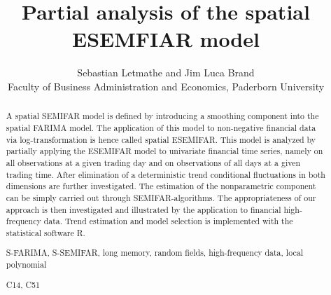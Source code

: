 \documentclass[12pt]{article}
\begin{document}
\title{Partial analysis of the spatial ESEMFIAR model}
\author{Sebastian Letmathe and Jim Luca Brand\\ Faculty of Business Administration and Economics,
Paderborn University}
\maketitle


\begin{abstract}

\noindent 
 A  spatial SEMIFAR model is defined by introducing a smoothing component into the spatial FARIMA model. The application of this model to non-negative financial data via log-transformation is hence called spatial ESEMIFAR. This model is analyzed by partially applying the ESEMIFAR model to univariate financial time series, namely on all observations at a given trading day and on observations of all days at a given trading time. After elimination of a deterministic trend conditional fluctuations in both dimensions are further investigated. The estimation of the nonparametric component can be simply carried out through SEMIFAR-algorithms. The appropriateness of our approach is then investigated and illustrated by the application to financial high-frequency data. Trend estimation and model selection is implemented with the statistical software R. 
 
\vspace{.3cm}

  S-FARIMA, S-SEMIFAR, long memory, random fields, high-frequency data, local polynomial


\vspace{.3cm}

 C14, C51
\end{abstract}
\newpage
\end{document}

